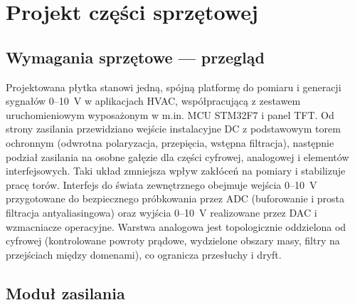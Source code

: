 \section{Projekt części sprzętowej}

\label{sec:wymagania-sprzetowe-przeglad}
\subsection{Wymagania sprzętowe — przegląd}
\label{sec:wymagania-sprzetowe-przeglad}

Projektowana płytka stanowi jedną, spójną platformę do pomiaru i generacji sygnałów 0--10~V w aplikacjach HVAC, współpracującą z zestawem uruchomieniowym wyposażonym w m.in. MCU STM32F7 i panel TFT. Od strony zasilania przewidziano wejście instalacyjne DC z podstawowym torem ochronnym (odwrotna polaryzacja, przepięcia, wstępna filtracja), następnie podział zasilania na osobne gałęzie dla części cyfrowej, analogowej i elementów interfejsowych. Taki układ zmniejsza wpływ zakłóceń na pomiary i stabilizuje pracę torów. Interfejs do świata zewnętrznego obejmuje wejścia 0--10~V przygotowane do bezpiecznego próbkowania przez ADC (buforowanie i prosta filtracja antyaliasingowa) oraz wyjścia 0--10~V realizowane przez DAC i wzmacniacze operacyjne. Warstwa analogowa jest topologicznie oddzielona od cyfrowej (kontrolowane powroty prądowe, wydzielone obszary masy, filtry na przejściach między domenami), co ogranicza przesłuchy i dryft.


\subsection{Moduł zasilania}

